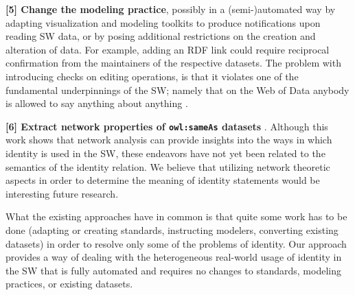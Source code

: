 \textbf{[5] Change the modeling practice}, possibly in a (semi-)automated way
  by adapting visualization and modeling toolkits to produce notifications
  upon reading SW data, or by posing additional restrictions on the creation
  and alteration of data. For example, adding an RDF link could require
  reciprocal confirmation from the maintainers of the respective datasets.
  \cite{HalpinHayes2010,DingShinavierFininMcguinness2010}
The problem with introducing checks on editing operations,
  is that it violates one of the fundamental underpinnings of the SW;
  namely that on the Web of Data anybody is allowed to say
  anything about anything \cite{AntoniouGrothHarmelenHoekstra2012}.

\textbf{[6] Extract network properties of {\small \texttt{owl:sameAs}}
  datasets} \cite{DingShinavierShangguanMcguinness2010}.
Although this work shows that network analysis can provide insights
  into the ways in which identity is used in the SW,
  these endeavors have not yet been related to the semantics of the
  identity relation.
We believe that utilizing network theoretic aspects in order to
  determine the meaning of identity statements
  would be interesting future research.

What the existing approaches have in common is
  that quite some work has to be done
  (adapting or creating standards, instructing modelers, converting existing
  datasets) in order to resolve only some of the problems of identity.
Our approach provides a way of dealing with the heterogeneous real-world
  usage of identity in the SW that is fully automated and requires
  no changes to standards, modeling practices, or existing datasets.
